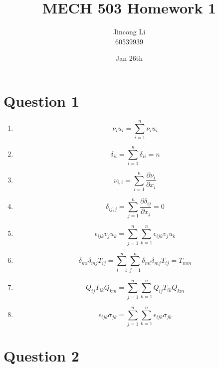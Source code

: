 \documentclass[a4paper,12pt]{article} %
\begin{document}
\newcommand{\vect}[1]{\mathbf{#1}}

\title{MECH 503 Homework 1}
\author{Jincong Li \\ 60539939}
\date{Jan 26th}
\maketitle

\section{\textbf{Question 1}}

\begin{enumerate}[label= (\alph*)]
    \item \[ \nu_i u_i = \sum_{i=1}^{n} \nu_i u_i \]
    
    \item \[ \delta_{ii} = \sum_{i=1}^{n} \delta_{ii} = n \]

    \item \[ \nu_{i,i} = \sum_{i=1}^{n} \frac{\partial \nu_i}{\partial x_i} \]

    \item \[ \delta_{ij,j} = \sum_{j=1}^{n} \frac{\partial \delta_{ij}}{\partial x_j} = 0 \]

    \item \[ \epsilon_{ijk} v_j u_k = \sum_{j=1}^{n} \sum_{k=1}^{n} \epsilon_{ijk} v_j u_k \]

    \item \[ \delta_{mi} \delta_{mj} T_{ij} = \sum_{i=1}^{n} \sum_{j=1}^{n} \delta_{mi} \delta_{mj} T_{ij} = T_{mm} \]

    \item \[ Q_{ij} T_{ik} Q_{km} = \sum_{j=1}^{n} \sum_{k=1}^{n} Q_{ij} T_{ik} Q_{km} \]

    \item \[ \epsilon_{ijk} \sigma_{jk} = \sum_{j=1}^{n} \sum_{k=1}^{n} \epsilon_{ijk} \sigma_{jk} \]
\end{enumerate}

\section{\textbf{Question 2}}
\end{document}
